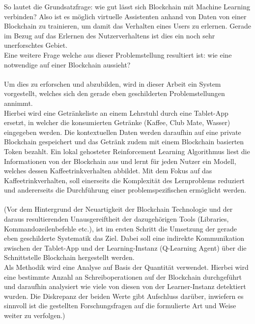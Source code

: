 So lautet die Grundsatzfrage: wie gut lässt sich Blockchain mit Machine Learning verbinden? Also ist es möglich virtuelle Assistenten anhand von Daten von einer Blockchain zu trainieren, um damit das Verhalten eines Users zu erlernen. 
Gerade im Bezug auf das Erlernen des Nutzerverhaltens ist dies ein noch sehr unerforschtes Gebiet. \\
Eine weitere Frage welche aus dieser Problemstellung resultiert ist: wie eine notwendige  auf einer Blockchain aussieht?\\\\
Um dies zu erforschen und abzubilden, wird in dieser Arbeit ein System vorgestellt, welches sich den gerade eben geschilderten Problemstellungen annimmt. \\
Hierbei wird eine Getränkeliste an einem Lehrstuhl durch eine Tablet-App ersetzt, in welcher die konsumierten Getränke (Kaffee, Club Mate, Wasser) eingegeben werden. 
Die kontextuellen Daten werden daraufhin auf eine private Blockchain gespeichert und das Getränk zudem mit einem Blockchain basierten Token bezahlt. 
Ein lokal gehosteter Reinforcement Learning Algorithmus liest die Informationen von der Blockchain aus und lernt für jeden Nutzer ein Modell, welches dessen Kaffeetrinkverhalten abbildet. Mit dem Fokus auf das Kaffeetrinkverhalten, soll einerseits die Komplexität des Lernproblems reduziert und andererseits die Durchführung einer problemspezifischen  ermöglicht werden. \\
\\

(Vor dem Hintergrund der Neuartigkeit der Blockchain Technologie und der daraus resultierenden Unausgereiftheit der dazugehörigen Tools (Libraries, Kommandozeilenbefehle etc.), ist im ersten Schritt die Umsetzung der gerade eben geschilderte Systematik das Ziel. Dabei soll eine indirekte Kommunikation zwischen der Tablet-App und der Learning-Instanz (Q-Learning Agent) über die Schnittstelle Blockchain hergestellt werden. \\
Als Methodik wird eine Analyse auf Basis der Quantität verwendet. Hierbei wird eine bestimmte Anzahl an Schreiboperationen auf der Blockchain durchgeführt und daraufhin analysiert wie viele von diesen von der Learner-Instanz detektiert wurden. Die Diskrepanz der beiden Werte gibt Aufschluss darüber, inwiefern es sinnvoll ist die gestellten Forschungsfragen auf die formulierte Art und Weise weiter zu verfolgen.) \\
\\


